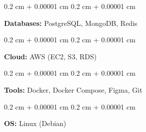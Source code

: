 \documentclass[10pt, letterpaper]{article}
\newenvironment{onecolentry}{
    \begin{adjustwidth}{
        0.2 cm + 0.00001 cm
    }{
        0.2 cm + 0.00001 cm
    }
}{
    \end{adjustwidth}
} %
\begin{document}
        \begin{onecolentry}
            \textbf{Databases:} PostgreSQL, MongoDB, Redis
        \end{onecolentry}

        \vspace{0.2 cm}
        
        \begin{onecolentry}
            \textbf{Cloud:} AWS (EC2, S3, RDS)
        \end{onecolentry}

        \vspace{0.2 cm}
        
        \begin{onecolentry}
            \textbf{Tools:} Docker, Docker Compose, Figma, Git
        \end{onecolentry}

        \vspace{0.2 cm}
        \begin{onecolentry}
            \textbf{OS:} Linux (Debian)
        \end{onecolentry}
\end{document}
